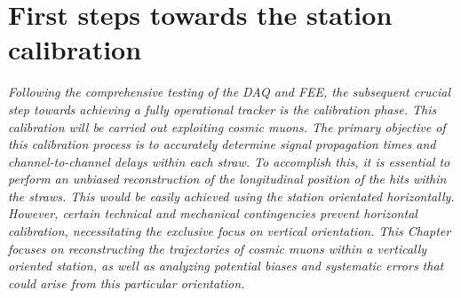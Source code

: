 \chapter{First steps towards the station calibration}\label{planning}
\textit{Following the comprehensive testing of the DAQ and FEE, the subsequent crucial 
step towards achieving a fully operational tracker is the calibration phase. This 
calibration will be carried out exploiting cosmic muons. The primary objective of 
this calibration process is to accurately determine signal propagation times and 
channel-to-channel delays within each straw. To accomplish this, it is essential 
to perform an unbiased reconstruction of the longitudinal position of the hits 
within the straws. This would be easily achieved using the station orientated horizontally. 
However, certain technical and mechanical contingencies prevent horizontal calibration, 
necessitating the exclusive focus on vertical orientation.
This Chapter focuses on reconstructing the trajectories of cosmic muons within a vertically oriented 
station, as well as analyzing potential biases and systematic errors that could 
arise from this particular orientation.}
